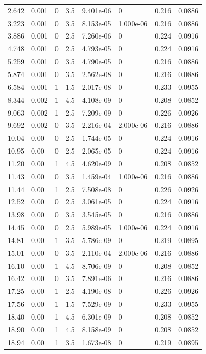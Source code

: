 \documentclass[preview]{standalone}
\begin{document}
{{\begin{tabular}{L{1.2cm}C{1.2cm} C{0.3cm}C{0.5cm} C{1.4cm}C{1.4cm} C{1.4cm}C{1.4cm}}
  2.642  &  0.001  & 0     & 3.5 &  9.401e-06  & 0  & 0.216 &  0.0886   \\ 
  3.223  &  0.001  & 0     & 3.5 &  8.153e-05  & 1.000e-06  & 0.216 &  0.0886   \\ 
  3.886  &  0.001  & 0     & 2.5 &  7.260e-06  & 0  & 0.224 &  0.0916   \\ 
  4.748  &  0.001  & 0     & 2.5 &  4.793e-05  & 0  & 0.224 &  0.0916   \\ 
  5.259  &  0.001  & 0     & 3.5 &  4.790e-05  & 0  & 0.216 &  0.0886   \\ 
  5.874  &  0.001  & 0     & 3.5 &  2.562e-08  & 0  & 0.216 &  0.0886   \\ 
  6.584  &  0.001  & 1     & 1.5 &  2.017e-08  & 0  & 0.233 &  0.0955   \\ 
  8.344  &  0.002  & 1     & 4.5 &  4.108e-09  & 0  & 0.208 &  0.0852   \\ 
  9.063  &  0.002  & 1     & 2.5 &  7.209e-09  & 0  & 0.226 &  0.0926   \\ 
  9.692  &  0.002  & 0     & 3.5 &  2.216e-04  & 2.000e-06  & 0.216 &  0.0886   \\ 
  10.04  &  0.00  & 0     & 2.5 &  1.744e-05  & 0  & 0.224 &  0.0916   \\ 
  10.95  &  0.00  & 0     & 2.5 &  2.065e-05  & 0  & 0.224 &  0.0916   \\ 
  11.20  &  0.00  & 1     & 4.5 &  4.620e-09  & 0  & 0.208 &  0.0852   \\ 
  11.43  &  0.00  & 0     & 3.5 &  1.459e-04  & 1.000e-06  & 0.216 &  0.0886   \\ 
  11.44  &  0.00  & 1     & 2.5 &  7.508e-08  & 0  & 0.226 &  0.0926   \\ 
  12.52  &  0.00  & 0     & 2.5 &  3.061e-05  & 0  & 0.224 &  0.0916   \\ 
  13.98  &  0.00  & 0     & 3.5 &  3.545e-05  & 0  & 0.216 &  0.0886   \\ 
  14.45  &  0.00  & 0     & 2.5 &  5.989e-05  & 1.000e-06  & 0.224 &  0.0916   \\ 
  14.81  &  0.00  & 1     & 3.5 &  5.786e-09  & 0  & 0.219 &  0.0895   \\ 
  15.01  &  0.00  & 0     & 3.5 &  2.110e-04  & 2.000e-06  & 0.216 &  0.0886   \\ 
  16.10  &  0.00  & 1     & 4.5 &  8.706e-09  & 0  & 0.208 &  0.0852   \\ 
  16.42  &  0.00  & 0     & 3.5 &  7.891e-06  & 0  & 0.216 &  0.0886   \\ 
  17.25  &  0.00  & 1     & 2.5 &  4.190e-08  & 0  & 0.226 &  0.0926   \\ 
  17.56  &  0.00  & 1     & 1.5 &  7.529e-09  & 0  & 0.233 &  0.0955   \\ 
  18.40  &  0.00  & 1     & 4.5 &  6.301e-09  & 0  & 0.208 &  0.0852   \\ 
  18.90  &  0.00  & 1     & 4.5 &  8.158e-09  & 0  & 0.208 &  0.0852   \\ 
  18.94  &  0.00  & 1     & 3.5 &  1.673e-08  & 0  & 0.219 &  0.0895   \\ 
\hline 
\end{tabular} 

}}
\end{document}
